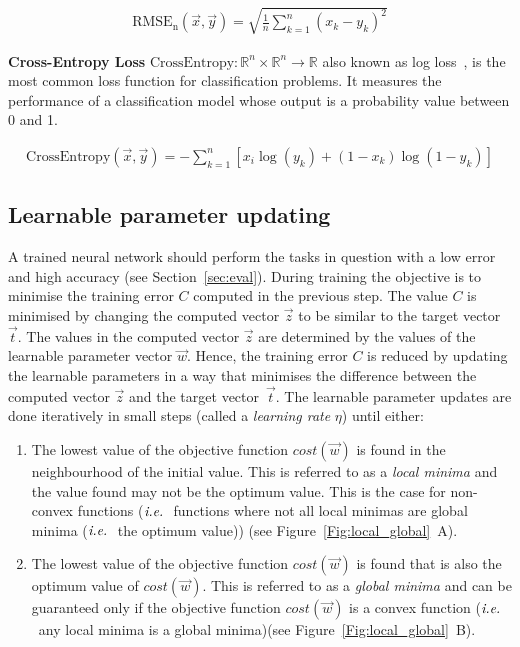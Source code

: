 \begin{eqnarray*}
\mathrm{RMSE_n}(\vec{x}, \vec{y})=\sqrt{\frac{1}{n} \sum_{k=1}^{n} (x_k - y_k)^2}
\end{eqnarray*}

\textbf{Cross-Entropy Loss} $\mathrm{CrossEntropy}: \mathbb{R}^n \times \mathbb{R}^n \to \mathbb{R}$ also known as log loss~\cite{shannon1948mathematical}, is the most common loss function for classification problems. It measures the performance of a classification model whose output is a probability value between 0 and 1.

\begin{eqnarray*}
\mathrm{CrossEntropy}(\vec{x}, \vec{y})= -\sum_{k=1}^{n} [x_i \log(y_k) + (1-x_k) \log(1-y_k)]
\end{eqnarray*}

\subsection{Learnable parameter updating}

A trained neural network should perform the tasks in question with a low error and high accuracy (see Section~\ref{sec:eval}). During training the objective is to minimise the training error $C$ computed in the previous step. The value $C$ is minimised by changing the computed vector $\vec{z}$ to be similar to the target vector $\vec{t}$. The values in the computed vector $\vec{z}$ are determined by the values of the learnable parameter vector $\vec{w}$. Hence, the training error $C$ is reduced by updating the learnable parameters in a way that minimises the difference between the computed vector $\vec{z}$ and the target vector~$\vec{t}$. The learnable parameter updates are done iteratively in small steps (called a \textit{learning rate} $\eta$) until either:

\begin{enumerate}
    \item The lowest value of the objective function $cost(\vec{w})$ is found in the neighbourhood of the initial value. This is referred to as a \emph{local minima} and the value found may not be the optimum value. This is the case for non-convex functions ($\textit{i.e.}\ $ functions where not all local minimas are global minima ($\textit{i.e.}\ $ the optimum value)) (see Figure~\ref{Fig:local_global}~A).
    \item The lowest value of the objective function $cost(\vec{w})$ is found that is also the optimum value of $cost(\vec{w})$. This is referred to as a \emph{global minima} and can be guaranteed only if the objective function $cost(\vec{w})$ is a convex function ($\textit{i.e.}\ $~any local minima is a global minima)(see Figure~\ref{Fig:local_global}~B). 
\end{enumerate}


